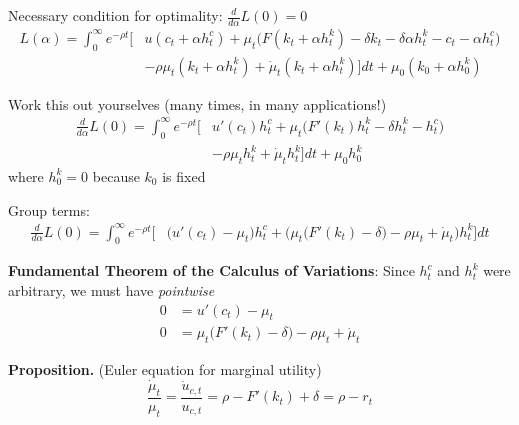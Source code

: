 \documentclass[11pt, aspectratio=169]{beamer}
\begin{document}
\begin{frame}{}

Necessary condition for optimality: $\frac{d}{d \alpha} L(0) = 0$
\begin{align*}
L(\alpha) = \int_0^\infty e^{-\rho t} \bigg[ &u(c_t + \alpha h_t^c) + \mu_t \bigg( F(k_t + \alpha h_t^k) - \delta k_t - \delta \alpha h_t^k - c_t - \alpha h_t^c \bigg) \\
&- \rho \mu_t (k_t + \alpha h_t^k) + \dot \mu_t (k_t + \alpha h_t^k) \bigg] dt + \mu_0 (k_0 + \alpha h_0^k)
\end{align*}

Work this out yourselves (many times, in many applications!)
\begin{align*}
\frac{d}{d \alpha}L(0) = \int_0^\infty e^{-\rho t} \bigg[ &u'(c_t) h_t^c + \mu_t \bigg( F'(k_t) h_t^k  - \delta h_t^k - h_t^c \bigg) \\
&- \rho \mu_t h_t^k + \dot \mu_t h_t^k \bigg] dt + \mu_0 h_0^k
\end{align*}
where $h_0^k = 0$ because $k_0$ is fixed


\end{frame}



\begin{frame}{}

Group terms: 
\begin{align*}
\frac{d}{d \alpha}L(0) = \int_0^\infty e^{-\rho t} \bigg[ &\bigg( u'(c_t) - \mu_t \bigg) h_t^c + \bigg( \mu_t \Big( F'(k_t) - \delta \Big) - \rho \mu_t + \dot \mu_t \bigg) h_t^k \bigg] dt 
\end{align*}

\vspace{5mm}
\textbf{Fundamental Theorem of the Calculus of Variations}: Since $h_t^c$ and $h_t^k$ were arbitrary, we must have \textit{pointwise}
\begin{align*}
0 &= u'(c_t) - \mu_t \\
0 &= \mu_t \Big( F'(k_t) - \delta \Big) - \rho \mu_t + \dot \mu_t
\end{align*}

\vspace{5mm}
\textbf{Proposition.} (Euler equation for marginal utility) 
\begin{equation*}
\frac{\dot \mu_t}{\mu_t} = \frac{\dot u_{c, t}}{u_{c, t}} = \rho -  F'(k_t) + \delta = \rho - r_t 
\end{equation*}

\end{frame}
\end{document}
